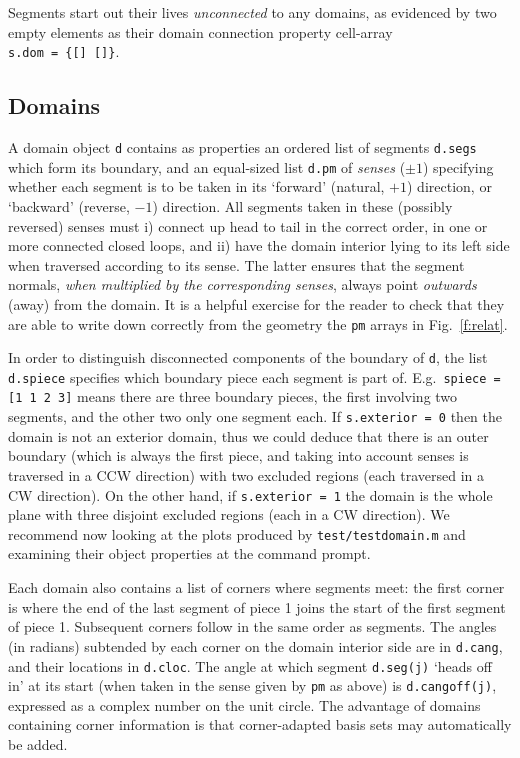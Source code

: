 \documentclass[12pt]{article}
\begin{document}
Segments start out their lives {\em unconnected} to any domains,
as evidenced by two empty elements as their domain connection
property cell-array \\
\verb?s.dom = {[] []}?.

\subsection{Domains}

A domain object {\tt d} contains as properties
an ordered list of segments {\tt d.segs} which form its
boundary, and an equal-sized
list {\tt d.pm} of {\em senses} ($\pm1$)
specifying whether each segment is to be taken in its `forward'
(natural, $+1$) direction, or `backward' (reverse, $-1$) direction.
All segments taken in these (possibly reversed) senses must
i) connect up head to tail in the correct order,
in one or more connected closed loops,
and ii) have the domain interior lying to its left side when traversed
according to its sense.
The latter ensures that the segment normals, {\em when multiplied by the
corresponding senses}, always point {\em outwards} (away) from
the domain.
It is a helpful exercise for the reader to
check that they are able to write down correctly from the geometry
the {\tt pm} arrays in Fig.~\ref{f:relat}.

In order to distinguish disconnected components of the boundary of
{\tt d}, the list {\tt d.spiece} specifies which boundary piece each
segment is part of. E.g.\ {\tt spiece = [1 1 2 3]} means
there are three boundary pieces, the first involving
two segments, and the other two only one segment each.
If {\tt s.exterior = 0}
then the domain is not an exterior domain, thus we could deduce that
there is an outer boundary (which is always the first piece, and 
taking into account senses is traversed in a CCW direction)
with two excluded regions (each traversed in a CW direction).
On the other hand, if {\tt s.exterior = 1} the domain is the whole plane
with three disjoint excluded regions (each in a CW direction).
We recommend now looking at the plots produced by
{\tt test/testdomain.m} and examining their object properties
at the command prompt.

Each domain also contains a list of corners where segments meet:
the first corner is where the
end of the last segment of piece 1 joins the start of the first segment
of piece 1. Subsequent corners follow in the same order as segments.
The angles (in radians) subtended by each 
corner on the domain interior side are in {\tt d.cang}, and their
locations in {\tt d.cloc}.
The angle at which segment {\tt d.seg(j)}
`heads off in' at its start (when taken in the sense given by
{\tt pm} as above) is {\tt d.cangoff(j)},
expressed as a complex number on the unit circle.
The advantage of domains containing corner information is that
corner-adapted basis sets may automatically be added.
\end{document}
